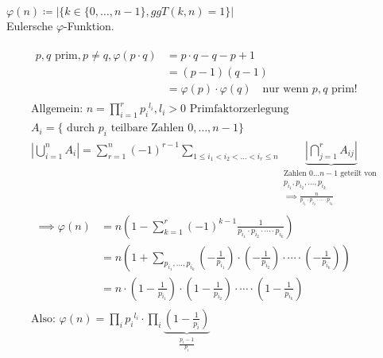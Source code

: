 $\varphi(n) \coloneqq |\{k \in \{0 , \dotsc , n-1 \} , ggT(k,n) = 1 \}|$ \\
Eulersche $\varphi$-Funktion.\\
\begin{bsp*}
	\begin{gather*}
		\begin{split}
			p,q \text{ prim}, p \neq q, \varphi(p \cdot q) &= p \cdot q  - q - p + 1 \\
			&= (p-1)(q-1) \\
			&= \varphi(p) \cdot \varphi(q) \quad \text{nur wenn $p,q$ prim!}
		\end{split} \\
		\text{Allgemein: } n = \prod_{i=1}^r {p_i}^{l_i} , l_i > 0 \text{ Primfaktorzerlegung} \\
		A_i = \{ \text{ durch $p_i$ teilbare Zahlen $0, \dotsc , n-1$} \} \\
		|\bigcup_{i=1}^n A_i| = \sum_{r=1}^n (-1)^{r-1} \sum_{1 \leq i_1 < i_2 < \dots < i_r \leq n} \underbrace{|\bigcap_{j=1}^r A_{ij}|}_{\substack{\text{Zahlen $0 \dots n-1$ geteilt von } \\p_{i_1} , p_{i_2} , \dotsc , p_{i_k} \\\implies \frac{n}{p_{i_1} \cdot p_{i_2} \cdot \dotsm \cdot p_{i_k}}}} \\
		\begin{split}
			\implies \varphi(n) &= n ( 1 - \sum_{k=1}^r (-1)^{k-1} \frac{1}{p_{i_1} \cdot p_{i_2} \cdot \dotsm \cdot p_{i_k}} ) \\
			&= n ( 1 + \sum_{p_{i_1} , \dotsc , p_{i_k}} (-\frac{1}{p_{i_1}}) \cdot (-\frac{1}{p_{i_2}}) \cdot \dotsm \cdot (-\frac{1}{p_{i_k}}) ) \\
			&= n \cdot (1-\frac{1}{p_{i_1}}) \cdot (1-\frac{1}{p_{i_2}}) \cdot \dotsm \cdot (1-\frac{1}{p_{i_k}})
		\end{split} \\
		\text{Also: } \varphi(n) = \prod_i {p_i}^{l_i} \cdot \prod_i \underbrace{(1- \frac{1}{p_i})}_{\frac{p_i-1}{p_i}}
	\end{gather*}
\end{bsp*}

